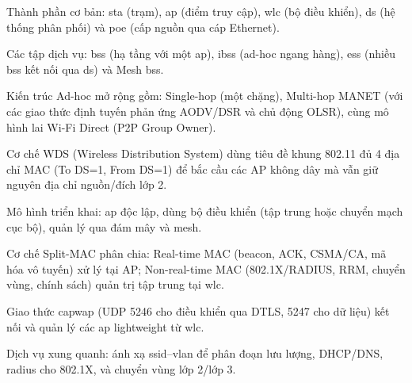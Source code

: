\begin{tomtat}
\item Thành phần cơ bản: \acs{sta} (trạm), \acs{ap} (điểm truy cập), \acs{wlc} (bộ điều khiển),
  \acs{ds} (hệ thống phân phối) và \acs{poe} (cấp nguồn qua cáp Ethernet).
\item Các tập dịch vụ: \acs{bss} (hạ tầng với một \acs{ap}), \acs{ibss} (ad-hoc ngang hàng),
  \acs{ess} (nhiều \acs{bss} kết nối qua \acs{ds}) và Mesh \acs{bss}.
\item Kiến trúc Ad-hoc mở rộng gồm: Single-hop (một chặng), Multi-hop MANET (với các giao thức
  định tuyến phản ứng AODV/DSR và chủ động OLSR), cùng mô hình lai Wi-Fi Direct (P2P Group Owner).
\item Cơ chế WDS (Wireless Distribution System) dùng tiêu đề khung 802.11 đủ 4 địa chỉ MAC (To DS=1,
  From DS=1) để bắc cầu các AP không dây mà vẫn giữ nguyên địa chỉ nguồn/đích lớp 2.
\item Mô hình triển khai: \acs{ap} độc lập, dùng bộ điều khiển (tập trung hoặc chuyển mạch cục bộ),
  quản lý qua đám mây và mesh.
\item Cơ chế Split-MAC phân chia: Real-time MAC (beacon, ACK, CSMA/CA, mã hóa vô tuyến) xử lý tại AP;
  Non-real-time MAC (802.1X/RADIUS, RRM, chuyển vùng, chính sách) quản trị tập trung tại \acs{wlc}.
\item Giao thức \acs{capwap} (UDP 5246 cho điều khiển qua DTLS, 5247 cho dữ liệu)
  kết nối và quản lý các \acs{ap} lightweight từ \acs{wlc}.
\item Dịch vụ xung quanh: ánh xạ \acs{ssid}--\acs{vlan} để phân
  đoạn lưu lượng, DHCP/DNS, \acs{radius} cho 802.1X, và chuyển vùng lớp 2/lớp 3.
\end{tomtat}
\endgroup

